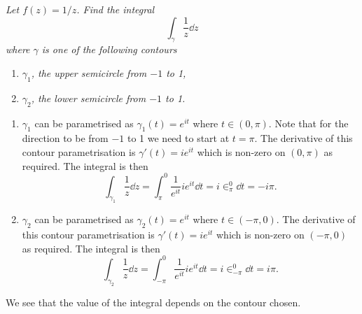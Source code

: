 \documentclass{article}
\begin{document}
    \begin{example}\label{exa:integral 2}
        \textit{
            Let \(f(z) = 1/z\).
            Find the integral
        }
            \[\int_{\gamma} \frac{1}{z} \dd{z}\]
        \textit{
            where \(\gamma\) is one of the following contours
        }
        \begin{enumerate}[label=\textit{\arabic*.}]
            \item \textit{\(\gamma_1\), the upper semicircle from \(-1\) to 1,}
            \item \textit{\(\gamma_2\), the lower semicircle from \(-1\) to 1.}
        \end{enumerate}
        \begin{enumerate}
            \item \(\gamma_1\) can be parametrised as \(\gamma_1(t) = e^{it}\) where \(t\in(0, \pi)\).
            Note that for the direction to be from \(-1\) to 1 we need to start at \(t = \pi\).
            The derivative of this contour parametrisation is \(\gamma'(t) = ie^{it}\) which is non-zero on \((0, \pi)\) as required.
            The integral is then
            \[\int_{\gamma_1} \frac{1}{z}\dd{z} = \int_{\pi}^{0} \frac{1}{e^{it}}ie^{it}\dd{t} = i\in_\pi^0 \dd{t} = -i\pi.\]
            
            \item \(\gamma_2\) can be parametrised as \(\gamma_2(t) = e^{it}\) where \(t\in(-\pi, 0)\).
            The derivative of this contour parametrisation is \(\gamma'(t) = ie^{it}\) which is non-zero on \((-\pi, 0)\) as required.
            The integral is then
            \[\int_{\gamma_2} \frac{1}{z}\dd{z} = \int_{-\pi}^{0} \frac{1}{e^{it}}ie^{it}\dd{t} = i\in_{-\pi}^0 \dd{t} = i\pi.\]
        \end{enumerate}
        We see that the value of the integral depends on the contour chosen.
    \end{example}
\end{document}
